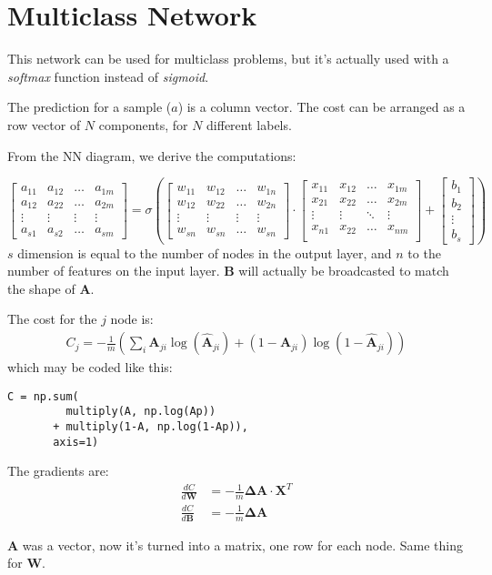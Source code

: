 \section{Multiclass Network}

This network can be used for multiclass problems, but it's actually used with a \textit{softmax} function instead of \textit{sigmoid}. 

The prediction for a sample ($a$) is a column vector. The cost can be arranged as a row vector of $N$ components, for $N$ different labels.

From the NN diagram, we derive the computations:

\begin{equation*}
  \begin{bmatrix}
    a_{11} & a_{12}& \ldots& a_{1m}\\ 
    a_{12} & a_{22}& \ldots& a_{2m}\\ 
    \vdots & \vdots & \vdots& \vdots\\ 
    a_{s1} & a_{s2}& \ldots& a_{sm} 
  \end{bmatrix}
    =\sigma( 
  \begin{bmatrix}
    w_{11} & w_{12}& \ldots& w_{1n}\\ 
    w_{12} & w_{22}& \ldots& w_{2n}\\ 
    \vdots & \vdots & \vdots& \vdots\\ 
    w_{sn} & w_{sn}& \ldots& w_{sn} 
  \end{bmatrix}
  \cdot{}
  \begin{bmatrix}
    x_{11} & x_{12} & \ldots & x_{1m}\\
    x_{21} & x_{22} & \ldots & x_{2m}\\
    \vdots & \vdots & \ddots & \vdots\\
    x_{n1} & x_{22} & \ldots & x_{nm}\\
  \end{bmatrix}
  +
  \begin{bmatrix}
    b_1\\ b_2\\ \vdots\\ b_s
  \end{bmatrix})
\end{equation*}
$s$ dimension is equal to the number of nodes in the output layer, and $n$ to the number of features on the input layer. $\mathbf{B}$ will actually be broadcasted to match the shape of $\mathbf{A}$. 

The cost for the $j$ node is:
\begin{align}
  C_j = -\frac{1}{m}\left(\sum_i \mathbf{A}_{ji}\log(\hat{\mathbf{A}}_{ji}) + (1-\mathbf{A}_{ji})\log(1-\hat{\mathbf{A}}_{ji})\right) 
\end{align}
which may be coded like this:
\begin{verbatim}
C = np.sum(
         multiply(A, np.log(Ap))
       + multiply(1-A, np.log(1-Ap)),
       axis=1)
\end{verbatim}
The gradients are: 
\begin{align}
  \frac{dC}{d\mathbf{W}} &= -\frac{1}{m}\mathbf{\Delta A}\cdot{}\mathbf{X}^T\\
  \frac{dC}{d\mathbf{B}} &= -\frac{1}{m}\mathbf{\Delta A}
\end{align}

$\mathbf{A}$ was a vector, now it's turned into a matrix, one row for each node. Same thing for $\mathbf{W}$.
